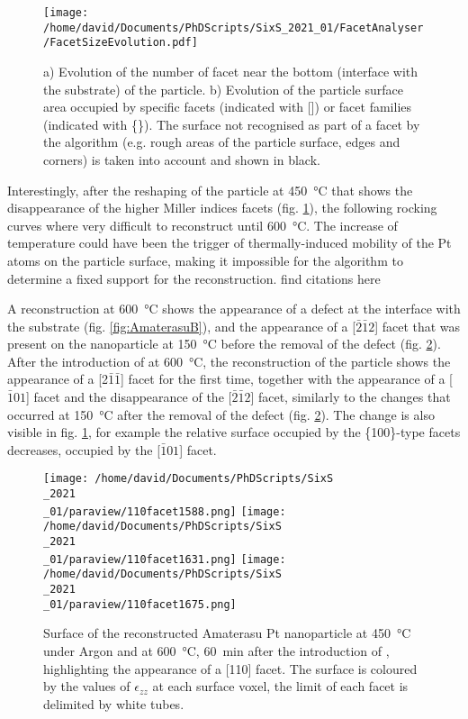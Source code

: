 \begin{figure}[!htb]
    \centering
    \texttt{[image: /home/david/Documents/PhDScripts/SixS\_2021\_01/FacetAnalyser/FacetSizeEvolution.pdf]}
    \caption{
        a) Evolution of the number of facet near the bottom (interface with the substrate) of the particle.
        b) Evolution of the particle surface area occupied by specific facets (indicated with []) or facet families (indicated with \{\}).
        The surface not recognised as part of a facet by the algorithm (e.g. rough areas of the particle surface, edges and corners) is taken into account and shown in black.
    }
    \label{fig:AmaterasuFacetsEvolution}
\end{figure}

Interestingly, after the reshaping of the particle at \qty{450}{\degreeCelsius} that shows the disappearance of the higher Miller indices facets (fig. \ref{fig:AmaterasuFacetsEvolution}), the following rocking curves where very difficult to reconstruct until \qty{600}{\degreeCelsius}.
The increase of temperature could have been the trigger of thermally-induced mobility of the Pt atoms on the particle surface, making it impossible for the algorithm to determine a fixed support for the reconstruction.
\textcolor{Important}{find citations here}

A reconstruction at \qty{600}{\degreeCelsius} shows the appearance of a defect at the interface with the substrate (fig. \ref{fig:AmaterasuB}), and the appearance of a [$\bar{2}\bar{1}2$] facet that was present on the nanoparticle at \qty{150}{\degreeCelsius} before the removal of the defect (fig. \ref{fig:Amaterasu110}).
After the introduction of \ammonia at \qty{600}{\degreeCelsius}, the reconstruction of the particle shows the appearance of a [2$\bar{1}\bar{1}$] facet for the first time, together with the appearance of a [$\bar{1}01$] facet and the disappearance of the [$\bar{2}\bar{1}2$] facet, similarly to the changes that occurred at \qty{150}{\degreeCelsius} after the removal of the defect (fig. \ref{fig:Amaterasu110}).
The change is also visible in fig. \ref{fig:AmaterasuFacetsEvolution}, for example the relative surface occupied by the \{100\}-type facets decreases, occupied by the [$\bar{1}01$] facet.

\begin{figure}[!htb]
    \centering
    \texttt{[image: /home/david/Documents/PhDScripts/SixS\\\_2021\\\_01/paraview/110facet1588.png]}
    \texttt{[image: /home/david/Documents/PhDScripts/SixS\\\_2021\\\_01/paraview/110facet1631.png]}
    \texttt{[image: /home/david/Documents/PhDScripts/SixS\\\_2021\\\_01/paraview/110facet1675.png]}
    \caption{
        Surface of the reconstructed Amaterasu Pt nanoparticle at \qty{450}{\degreeCelsius} under Argon and at \qty{600}{\degreeCelsius}, \qty{60}{\minute} after the introduction of \ammonia, highlighting the appearance of a [110] facet.
        The surface is coloured by the values of $\epsilon_{zz}$ at each surface voxel, the limit of each facet is delimited by white tubes.
    }
    \label{fig:Amaterasu110}
\end{figure}

